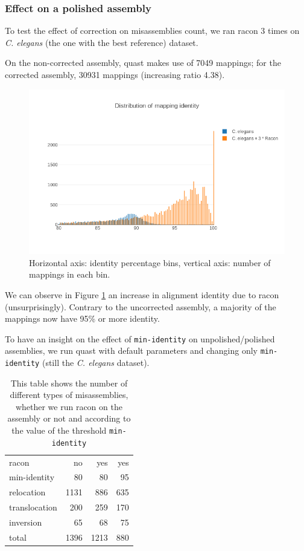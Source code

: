 \documentclass[./main.tex]{subfiles}
\begin{document}
\subsubsection{Effect on a polished assembly}

To test the effect of correction on misassemblies count, we ran racon 3
times on \emph{C. elegans} (the one with the best reference) dataset.

On the non-corrected assembly, quast makes use of 7049 mappings; for the
corrected assembly, 30931 mappings (increasing ratio 4.38).

\begin{figure}[ht]
    \centering
    \includegraphics[width=\textwidth]{paper/misassemblies-in-noisy-assemblies/misassemblies_mapping_identity_distribution_racon.png}
    \caption{Horizontal axis: identity percentage bins, vertical axis: number of mappings in each bin.}
    \label{mapping_identity_racon}
\end{figure}

We can observe in Figure \ref{mapping_identity_racon} an increase in alignment identity due to racon
(unsurprisingly). Contrary to the uncorrected assembly, a majority of
the mappings now have 95\% or more identity.

To have an insight on the effect of \texttt{min-identity} on
unpolished/polished assemblies, we run quast with default parameters and
changing only \texttt{min-identity} (still the \emph{C. elegans}
dataset).

\begin{table}[ht]
    \centering
    \begin{tabular}{l|rrr}
    racon & no & yes & yes \\
    min-identity & 80 & 80 & 95 \\ \hline 
    relocation & 1131 & 886 & 635 \\
    translocation & 200 & 259 & 170 \\
    inversion & 65 & 68 & 75 \\
    total & 1396 & 1213 & 880 \\
    \end{tabular}
    \caption{This table shows the number of different types of misassemblies, whether we run racon on the assembly or not and according to the value of the threshold \texttt{min-identity}}
    \label{tab:my_label}
\end{table}
\end{document}
